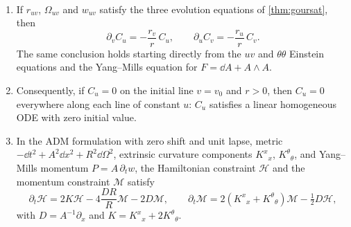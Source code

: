 \begin{theorem}\label{thm:constrprop}\ver\
\begin{enumerate}[label=(\roman*)]
\item If $r_{uv}$, $\Omega_{uv}$ and $w_{uv}$ satisfy the three evolution equations of \cref{thm:goursat}, then
\[
\partial_vC_u=-\frac{r_v}{r}\,C_u,\qquad \partial_uC_v=-\frac{r_u}{r}\,C_v .
\]
The same conclusion holds starting directly from the $uv$ and $\theta\theta$ Einstein equations and the Yang--Mills equation for $F=\dd A+A\wedge A$.
\item Consequently, if $C_u=0$ on the initial line $v=v_0$ and $r>0$, then $C_u=0$ everywhere along each line of constant $u$: $C_u$ satisfies a linear homogeneous ODE with zero initial value.
\item In the ADM formulation with zero shift and unit lapse, metric $-\dd t^2+A^2\dd x^2+R^2\dd\Omega^2$, extrinsic curvature components $K^x{}_x$, $K^\theta{}_\theta$, and Yang--Mills momentum $P=A\,\partial_tw$, the Hamiltonian constraint $\mathcal H$ and the momentum constraint $\mathcal M$ satisfy
\[
\partial_t\mathcal H=2K\mathcal H-4\frac{DR}{R}\mathcal M-2D\mathcal M,\qquad \partial_t\mathcal M=2(K^x{}_x+K^\theta{}_\theta)\mathcal M-\tfrac12D\mathcal H,
\]
with $D=A^{-1}\partial_x$ and $K=K^x{}_x+2K^\theta{}_\theta$.
\end{enumerate}
\end{theorem}
